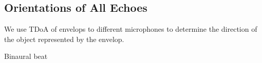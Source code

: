 

\subsection{Orientations of All Echoes}

We use TDoA of envelops to different microphones to determine the direction 
of the object represented by the envelop.


Binaural beat

